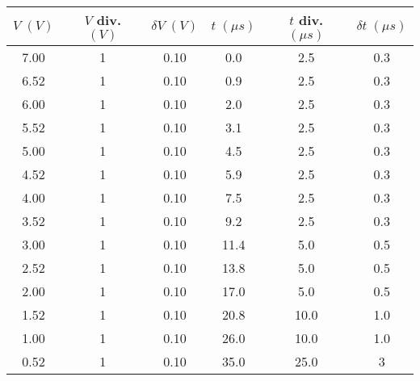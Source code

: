 \begin{tabular}{ccc|ccc}
\toprule
$V \; (V)$ & $V$ div. $(V)$ & $\delta V \; (V)$ & $t \; (\mu s)$ & $t$ div. $(\mu s)$ & $\delta t \; (\mu s)$ \\
\midrule
      7.00 &                1 &               0.10 &            0.0 &                  2.5 &                  0.3 \\
      6.52 &                1 &               0.10 &            0.9 &                  2.5 &                  0.3 \\
      6.00 &                1 &               0.10 &            2.0 &                  2.5 &                  0.3 \\
      5.52 &                1 &               0.10 &            3.1 &                  2.5 &                  0.3 \\
      5.00 &                1 &               0.10 &            4.5 &                  2.5 &                  0.3 \\
      4.52 &                1 &               0.10 &            5.9 &                  2.5 &                  0.3 \\
      4.00 &                1 &               0.10 &            7.5 &                  2.5 &                  0.3 \\
      3.52 &                1 &               0.10 &            9.2 &                  2.5 &                  0.3 \\
      3.00 &                1 &               0.10 &           11.4 &                  5.0 &                  0.5 \\
      2.52 &                1 &               0.10 &           13.8 &                  5.0 &                  0.5 \\
      2.00 &                1 &               0.10 &           17.0 &                  5.0 &                  0.5 \\
      1.52 &                1 &               0.10 &           20.8 &                 10.0 &                  1.0 \\
      1.00 &                1 &               0.10 &           26.0 &                 10.0 &                  1.0 \\
      0.52 &                1 &               0.10 &           35.0 &                 25.0 &                    3 \\
\bottomrule
\end{tabular}
